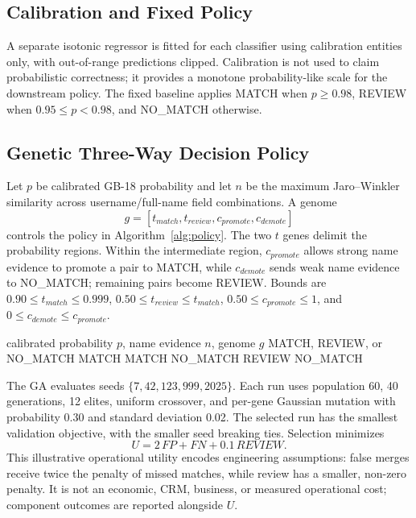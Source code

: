 \documentclass[conference]{IEEEtran}
\begin{document}
\subsection{Calibration and Fixed Policy}
A separate isotonic regressor is fitted for each classifier using calibration entities only, with out-of-range predictions clipped. Calibration is not used to claim probabilistic correctness; it provides a monotone probability-like scale for the downstream policy. The fixed baseline applies MATCH when $p\geq0.98$, REVIEW when $0.95\leq p<0.98$, and NO\_MATCH otherwise.

\subsection{Genetic Three-Way Decision Policy}
Let $p$ be calibrated GB-18 probability and let $n$ be the maximum Jaro--Winkler similarity across username/full-name field combinations. A genome
\begin{equation}
 g=[t_{match},t_{review},c_{promote},c_{demote}]
\end{equation}
controls the policy in Algorithm~\ref{alg:policy}. The two $t$ genes delimit the probability regions. Within the intermediate region, $c_{promote}$ allows strong name evidence to promote a pair to MATCH, while $c_{demote}$ sends weak name evidence to NO\_MATCH; remaining pairs become REVIEW. Bounds are $0.90\leq t_{match}\leq0.999$, $0.50\leq t_{review}\leq t_{match}$, $0.50\leq c_{promote}\leq1$, and $0\leq c_{demote}\leq c_{promote}$.

\begin{algorithm}[t]
\caption{Three-Way Decision Policy}
\label{alg:policy}
\begin{algorithmic}[1]
\Require calibrated probability $p$, name evidence $n$, genome $g$
\Ensure MATCH, REVIEW, or NO\_MATCH
  \State \Return MATCH
   \State \Return MATCH
   \State \Return NO\_MATCH
  \Else \State \Return REVIEW
  \EndIf
\Else
  \State \Return NO\_MATCH
\EndIf
\end{algorithmic}
\end{algorithm}

The GA evaluates seeds $\{7,42,123,999,2025\}$. Each run uses population 60, 40 generations, 12 elites, uniform crossover, and per-gene Gaussian mutation with probability 0.30 and standard deviation 0.02. The selected run has the smallest validation objective, with the smaller seed breaking ties. Selection minimizes
\begin{equation}
U=2\,FP+FN+0.1\,REVIEW.
\end{equation}
This illustrative operational utility encodes engineering assumptions: false merges receive twice the penalty of missed matches, while review has a smaller, non-zero penalty. It is not an economic, CRM, business, or measured operational cost; component outcomes are reported alongside $U$.
\end{document}
